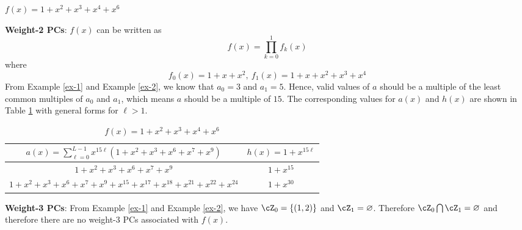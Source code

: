\begin{example}
$f(x)=1+x^2+x^3+x^4+x^6$\newline

\textbf{Weight-2 PCs}: $f(x)$ can be written as 
$$f(x)=\prod_{k=0}^{1}f_k(x)$$
where 
$$f_0(x)=1+x+x^2,~f_1(x)=1+x+x^2+x^3+x^4$$ 
From Example \ref{ex-1} and Example \ref{ex-2}, we know that $a_0=3$ and $a_1=5$.
Hence, valid values of $a$ should be a multiple of the least common multiples of $a_0$ and $a_1$, which means $a$ should be a multiple of $15$.
The corresponding values for $a(x)$ and $h(x)$ are shown in Table \ref{novelTab1-c} with general forms for $\ell>1$.

\begin{table}[htbp]
\renewcommand{\arraystretch}{1.3}
 \caption{$f(x)=1+x^2+x^3+x^4+x^6$}
 \centering
\begin{tabular}{c c } 
\hline
 $a(x)=\sum_{\ell=0}^{L-1} x^{15\ell}(1+x^2+x^3+x^6+x^7+x^9)$ & $h(x)=1+x^{15\ell}$ \\ [0.5ex] 
\hline\hline
$1+x^2+x^3+x^6+x^7+x^9$ & $1+x^{15}$\\ 
$1+x^2+x^3+x^6+x^7+x^9+x^{15}+x^{17}+x^{18}+x^{21}+x^{22}+x^{24}$ & $1+x^{30}$ \\
\end{tabular}
 \label{novelTab1-c}
\end{table}

\textbf{Weight-3 PCs}:
From Example \ref{ex-1} and Example \ref{ex-2}, we have $\cZ_0=\{ (1,2)\}$ and $\cZ_1=\varnothing$. Therefore $\cZ_0 \bigcap \cZ_1= \varnothing$ and therefore there are no weight-3 PCs associated with $f(x)$.
\end{example}

